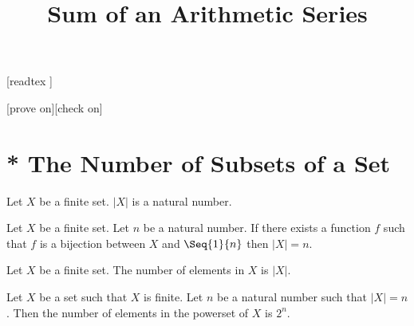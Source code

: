 \documentclass{article}
\title{Sum of an Arithmetic Series}
\author{}
\date{}
\begin{document}
\maketitle

\begin{forthel}

    [readtex ]

    [prove on][check on]
  \end{forthel}

\section{* The Number of Subsets of a Set}

\begin{forthel}
\begin{definition}
Let $X$ be a finite set.
$|X|$ is a natural number.
\end{definition}

\begin{lemma}
Let $X$ be a finite set. Let $n$ be a natural number.
If there exists a function $f$ such that $f$ is a bijection between $X$ and $\Seq{1}{n}$ then $|X|=n$.
\end{lemma}

\begin{definition}
Let $X$ be a finite set.
The number of elements in $X$ is $|X|$.
\end{definition}


\begin{theorem}
Let $X$ be a set such that $X$ is finite. Let $n$ be a natural number such that $|X|=n$.
Then the number of elements in the powerset of $X$ is $2^{n}$.
\end{theorem}
\end{forthel}
\end{document}

